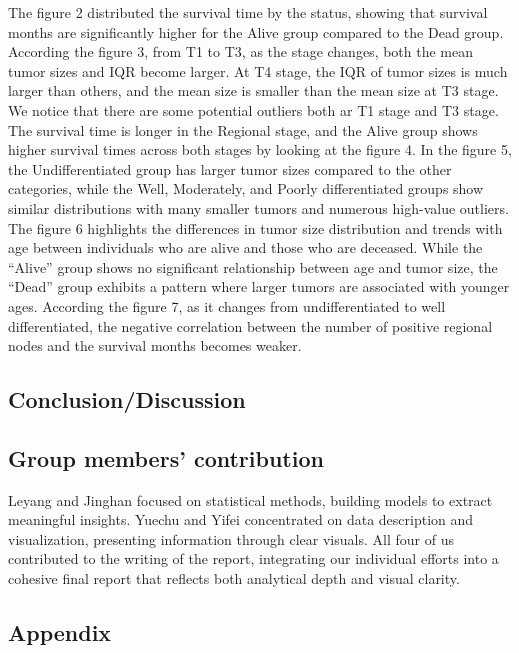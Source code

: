 \documentclass[
]{article}
\begin{document}
The figure 2 distributed the survival time by the status, showing that
survival months are significantly higher for the Alive group compared to
the Dead group. According the figure 3, from T1 to T3, as the stage
changes, both the mean tumor sizes and IQR become larger. At T4 stage,
the IQR of tumor sizes is much larger than others, and the mean size is
smaller than the mean size at T3 stage. We notice that there are some
potential outliers both ar T1 stage and T3 stage. The survival time is
longer in the Regional stage, and the Alive group shows higher survival
times across both stages by looking at the figure 4. In the figure 5,
the Undifferentiated group has larger tumor sizes compared to the other
categories, while the Well, Moderately, and Poorly differentiated groups
show similar distributions with many smaller tumors and numerous
high-value outliers. The figure 6 highlights the differences in tumor
size distribution and trends with age between individuals who are alive
and those who are deceased. While the ``Alive'' group shows no
significant relationship between age and tumor size, the ``Dead'' group
exhibits a pattern where larger tumors are associated with younger ages.
According the figure 7, as it changes from undifferentiated to well
differentiated, the negative correlation between the number of positive
regional nodes and the survival months becomes weaker.

\subsection{Conclusion/Discussion}\label{conclusiondiscussion}

\subsection{Group members'
contribution}\label{group-members-contribution}

Leyang and Jinghan focused on statistical methods, building models to
extract meaningful insights. Yuechu and Yifei concentrated on data
description and visualization, presenting information through clear
visuals. All four of us contributed to the writing of the report,
integrating our individual efforts into a cohesive final report that
reflects both analytical depth and visual clarity.

\subsection{Appendix}\label{appendix}
\end{document}
